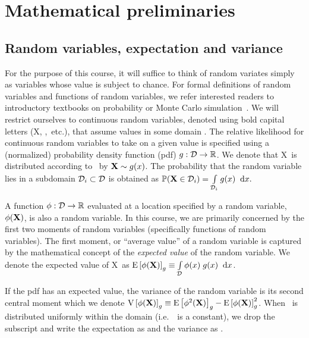 \chapter{Mathematical preliminaries}


\section{Random variables, expectation and variance}
For the purpose of this course, it will suffice to think of random variates simply as variables whose value is subject to chance. 
 For formal definitions of random variables and functions of random variables, we refer interested readers to introductory textbooks on probability or Monte Carlo simulation~\cite{robertc10}.
 We will restrict ourselves to continuous random variables, denoted using bold capital letters (\RV X, \yii,~etc.), that assume values in some domain \Dom. 
 The relative likelihood for continuous random variables to take on a given value is specified using a (normalized) probability density function (pdf) $g: \mathcal{D} \rightarrow \mathbb{R}$. We denote that \RV X\ is distributed according to \sdn\ by $\mathbf{X} \sim g(x)$. The probability that the random variable lies in a subdomain $\mathcal{D}_{i} \subset \mathcal{D}$ is obtained as 
  $\mathbb{P}(\mathbf{X} \in \mathcal{D}_{i}) = \int\limits_{\mathcal{D}_{i}}^{} g(x) \;\; \mathrm{d}x.$

A function $\phi:\mathcal{D}\rightarrow\mathbb{R}$ evaluated at a location specified by a random variable, $\phi(\mathbf{X})$, is also a random variable.
In this course, we are primarily concerned by the first two moments of random variables (specifically functions of random variables). The first moment, or ``average value'' of a random variable is captured by the mathematical concept of the \textit{expected value} of the random variable. We denote the expected value of \RV X\ as 
$ \mathrm{E} \left[\phi(\mathbf{X}) \right]_{g}   \equiv \int\limits_{\mathcal{D}}^{} \phi(x)\;g(x) \;\; \mathrm{d}x$. 

If the pdf has an expected value, the variance of the random variable is its second central moment which we denote
$\mathrm{V} \left[\phi(\mathbf{X})\right]_{g} \equiv \mathrm{E} \left[\phi^2(\mathbf{X}) \right]_{g} - \mathrm{E} \left[\phi(\mathbf{X}) \right]_{g}^2$. 
When \ is distributed uniformly within the domain (i.e.~\sdn\ is a constant), we drop the subscript and write the expectation as  and the variance as .


